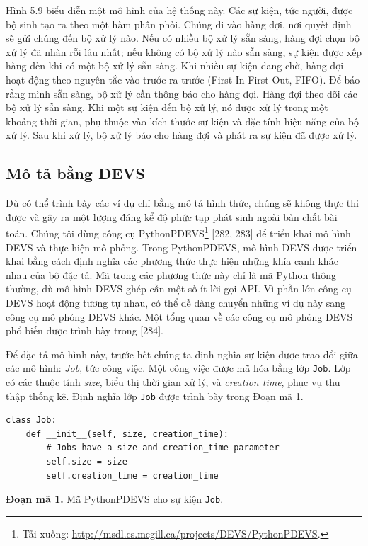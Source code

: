Hình 5.9 biểu diễn một mô hình của hệ thống này. Các sự kiện, tức người, được bộ sinh tạo ra theo một hàm phân phối. Chúng đi vào hàng đợi, nơi quyết định sẽ gửi chúng đến bộ xử lý nào. Nếu có nhiều bộ xử lý sẵn sàng, hàng đợi chọn bộ xử lý đã nhàn rỗi lâu nhất; nếu không có bộ xử lý nào sẵn sàng, sự kiện được xếp hàng đến khi có một bộ xử lý sẵn sàng. Khi nhiều sự kiện đang chờ, hàng đợi hoạt động theo nguyên tắc vào trước ra trước (First-In-First-Out, FIFO). Để báo rằng mình sẵn sàng, bộ xử lý cần thông báo cho hàng đợi. Hàng đợi theo dõi các bộ xử lý sẵn sàng. Khi một sự kiện đến bộ xử lý, nó được xử lý trong một khoảng thời gian,
phụ thuộc vào kích thước sự kiện và đặc tính hiệu năng của bộ xử lý. Sau khi xử lý, bộ xử lý báo cho hàng đợi và phát ra sự kiện đã được xử lý.

\subsection{Mô tả bằng DEVS}
Dù có thể trình bày các ví dụ chỉ bằng mô tả hình thức, chúng sẽ không thực thi được và gây ra một lượng đáng kể độ phức tạp phát sinh ngoài bản chất bài toán. Chúng tôi dùng công cụ PythonPDEVS\footnote{Tải xuống: \url{http://msdl.cs.mcgill.ca/projects/DEVS/PythonPDEVS}.} [282, 283] để triển khai mô hình DEVS và thực hiện mô phỏng. Trong PythonPDEVS, mô hình DEVS được triển khai bằng cách định nghĩa các phương thức thực hiện những khía cạnh khác nhau của bộ đặc tả. Mã trong các phương thức này chỉ là mã Python thông thường, dù mô hình DEVS ghép cần một số ít lời gọi API. Vì phần lớn công cụ DEVS hoạt động tương tự nhau, có thể dễ dàng chuyển những ví dụ này sang công cụ mô phỏng DEVS khác. Một tổng quan về các công cụ mô phỏng DEVS phổ biến được trình bày trong [284].

Để đặc tả mô hình này, trước hết chúng ta định nghĩa sự kiện được trao đổi giữa các mô hình: \emph{Job}, tức công việc. Một công việc được mã hóa bằng lớp \texttt{Job}. Lớp có các thuộc tính \emph{size}, biểu thị thời gian xử lý, và \emph{creation time}, phục vụ thu thập thống kê. Định nghĩa lớp \texttt{Job} được trình bày trong Đoạn mã 1.
\begin{verbatim}
class Job:
    def __init__(self, size, creation_time):
        # Jobs have a size and creation_time parameter
        self.size = size
        self.creation_time = creation_time
\end{verbatim}
\noindent\textbf{Đoạn mã 1.} Mã PythonPDEVS cho sự kiện \texttt{Job}.

